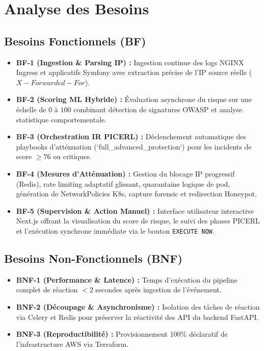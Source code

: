 \documentclass[12pt,a4paper]{report}
\begin{document}
\chapter{Analyse des Besoins}

\section{Besoins Fonctionnels (BF)}
\begin{itemize}
    \item \textbf{BF-1 (Ingestion \& Parsing IP) :} Ingestion continue des logs NGINX Ingress et applicatifs Symfony avec extraction précise de l'IP source réelle ($X-Forwarded-For$).
    \item \textbf{BF-2 (Scoring ML Hybride) :} Évaluation asynchrone du risque sur une échelle de $0$ à $100$ combinant détection de signatures OWASP et analyse statistique comportementale.
    \item \textbf{BF-3 (Orchestration IR PICERL) :} Déclenchement automatique des playbooks d'atténuation (`full_advanced_protection`) pour les incidents de score $\ge 76$ ou critiques.
    \item \textbf{BF-4 (Mesures d'Atténuation) :} Gestion du blocage IP progressif (Redis), rate limiting adaptatif glissant, quarantaine logique de pod, génération de NetworkPolicies K8s, capture forensic et redirection Honeypot.
    \item \textbf{BF-5 (Supervision \& Action Manuel) :} Interface utilisateur interactive Next.js offrant la visualisation du score de risque, le suivi des phases PICERL et l'exécution synchrone immédiate via le bouton \texttt{EXECUTE NOW}.
\end{itemize}

\section{Besoins Non-Fonctionnels (BNF)}
\begin{itemize}
    \item \textbf{BNF-1 (Performance \& Latence) :} Temps d'exécution du pipeline complet de réaction $< 2$ secondes après ingestion de l'événement.
    \item \textbf{BNF-2 (Découpage \& Asynchronisme) :} Isolation des tâches de réaction via Celery et Redis pour préserver la réactivité des API du backend FastAPI.
    \item \textbf{BNF-3 (Reproductibilité) :} Provisionnement 100\% déclaratif de l'infrastructure AWS via Terraform.
\end{itemize}
\end{document}

